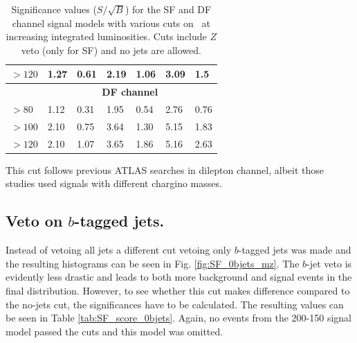 \begin{table}[H]
\begin{tabular}{|l|llllll}
$>120$  & \multicolumn{1}{l|}{1.27}               & \multicolumn{1}{l|}{0.61}               & \multicolumn{1}{l|}{2.19}               & \multicolumn{1}{l|}{1.06}               & \multicolumn{1}{l|}{3.09}               & \multicolumn{1}{l|}{1.5}                \\ \hline
                  & \multicolumn{6}{c|}{\textbf{DF channel}}                                                                                                                                                                                                                  \\ \hline
$>80$   & \multicolumn{1}{l|}{1.12}               & \multicolumn{1}{l|}{0.31}               & \multicolumn{1}{l|}{1.95}               & \multicolumn{1}{l|}{0.54}               & \multicolumn{1}{l|}{2.76}               & \multicolumn{1}{l|}{0.76}               \\ \hline
$>100$   & \multicolumn{1}{l|}{2.10}               & \multicolumn{1}{l|}{0.75}               & \multicolumn{1}{l|}{3.64}               & \multicolumn{1}{l|}{1.30}               & \multicolumn{1}{l|}{5.15}               & \multicolumn{1}{l|}{1.83}               \\ \hline
$>120$    & \multicolumn{1}{l|}{2.10}               & \multicolumn{1}{l|}{1.07}               & \multicolumn{1}{l|}{3.65}               & \multicolumn{1}{l|}{1.86}               & \multicolumn{1}{l|}{5.16}               & \multicolumn{1}{l|}{2.63}               \\ \hline
\end{tabular}
\caption{Significance values ($S/\sqrt{B}$) for the SF and DF channel signal models with various cuts on \mttwo \, at increasing integrated luminosities. Cuts include $Z$ veto (only for SF) and no jets are allowed.}
\label{tab:SF_score}
\end{table}

This cut follows previous ATLAS searches in dilepton channel, albeit those studies used signals with different chargino masses. 


\subsection{Veto on $b$-tagged jets.}

Instead of vetoing all jets a different cut vetoing only $b$-tagged jets was made and the resulting histograms can be seen in Fig. \ref{fig:SF_0bjets_mz}. The $b$-jet veto is evidently less drastic and leads to both more background and signal events in the final distribution. However, to see whether this cut makes difference compared to the no-jets cut, the significances have to be calculated. The resulting values can be seen in Table \ref{tab:SF_score_0bjets}. Again, no events from the 200-150 signal model passed the cuts and this model was omitted.

